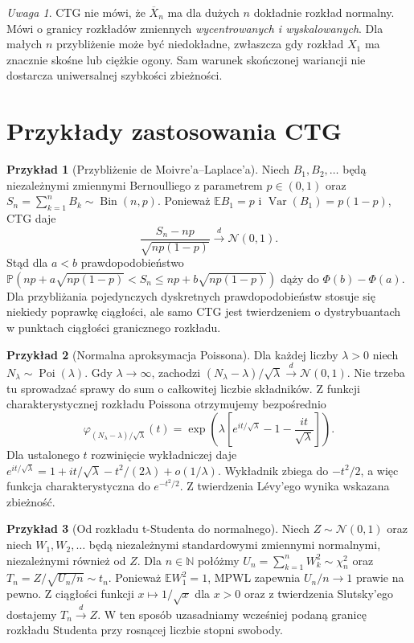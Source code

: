 \documentclass[11pt,a4paper,oneside]{report}
\numberwithin{equation}{chapter}
\theoremstyle{plain}
\theoremstyle{definition}
\newtheorem{przyklad}{Przykład}[chapter]
\theoremstyle{remark}
\newtheorem{uwaga}{Uwaga}[chapter]
\newcommand{\N}{\mathbb{N}}
\newcommand{\Prob}{\mathbb{P}}
\newcommand{\E}{\mathbb{E}}
\newcommand{\Var}{\operatorname{Var}}
\newcommand{\Bin}{\operatorname{Bin}}
\newcommand{\Poi}{\operatorname{Poi}}
\newcommand{\Normal}{\mathcal{N}}
\begin{document}
\begin{uwaga}
CTG nie mówi, że $\overline X_n$ ma dla dużych $n$
dokładnie rozkład normalny. Mówi o granicy rozkładów
zmiennych \emph{wycentrowanych i wyskalowanych}.
Dla małych $n$ przybliżenie może być niedokładne,
zwłaszcza gdy rozkład $X_1$ ma znacznie skośne
lub ciężkie ogony. Sam warunek skończonej wariancji
nie dostarcza uniwersalnej szybkości zbieżności.
\end{uwaga}

\section{Przykłady zastosowania CTG}

\begin{przyklad}[Przybliżenie de Moivre'a--Laplace'a]
Niech $B_1,B_2,\ldots$ będą niezależnymi zmiennymi
Bernoulliego z parametrem $p\in(0,1)$ oraz
$S_n=\sum_{k=1}^nB_k\sim\Bin(n,p)$.
Ponieważ $\E B_1=p$ i $\Var(B_1)=p(1-p)$,
CTG daje
\[
\frac{S_n-np}{\sqrt{np(1-p)}}\xrightarrow d\Normal(0,1).
\]
Stąd dla $a<b$ prawdopodobieństwo
$\Prob(np+a\sqrt{np(1-p)}<S_n\leq
np+b\sqrt{np(1-p)})$ dąży do $\Phi(b)-\Phi(a)$.
Dla przybliżania pojedynczych dyskretnych
prawdopodobieństw stosuje się niekiedy poprawkę ciągłości,
ale samo CTG jest twierdzeniem o dystrybuantach
w punktach ciągłości granicznego rozkładu.
\end{przyklad}

\begin{przyklad}[Normalna aproksymacja Poissona]
Dla każdej liczby $\lambda>0$ niech
$N_\lambda\sim\Poi(\lambda)$. Gdy $\lambda\to\infty$,
zachodzi
$(N_\lambda-\lambda)/\sqrt\lambda\xrightarrow d\Normal(0,1)$.
Nie trzeba tu sprowadzać sprawy do sum o całkowitej
liczbie składników. Z funkcji charakterystycznej
rozkładu Poissona otrzymujemy bezpośrednio
\[
\varphi_{(N_\lambda-\lambda)/\sqrt\lambda}(t)
=\exp\!\left(\lambda\left[e^{it/\sqrt\lambda}
-1-\frac{it}{\sqrt\lambda}\right]\right).
\]
Dla ustalonego $t$ rozwinięcie wykładniczej daje
$e^{it/\sqrt\lambda}=1+it/\sqrt\lambda
-t^2/(2\lambda)+o(1/\lambda)$.
Wykładnik zbiega do $-t^2/2$, a więc
funkcja charakterystyczna do $e^{-t^2/2}$.
Z twierdzenia Lévy'ego wynika wskazana zbieżność.
\end{przyklad}

\begin{przyklad}[Od rozkładu t-Studenta do normalnego]
Niech $Z\sim\Normal(0,1)$ oraz niech
$W_1,W_2,\ldots$ będą niezależnymi standardowymi
zmiennymi normalnymi, niezależnymi również od $Z$.
Dla $n\in\N$ połóżmy
$U_n=\sum_{k=1}^nW_k^2\sim\chi_n^2$ oraz
$T_n=Z/\sqrt{U_n/n}\sim t_n$.
Ponieważ $\E W_1^2=1$, MPWL zapewnia
$U_n/n\to1$ prawie na pewno. Z ciągłości funkcji
$x\mapsto1/\sqrt x$ dla $x>0$ oraz z twierdzenia
Slutsky'ego dostajemy $T_n\xrightarrow d Z$.
W ten sposób uzasadniamy wcześniej podaną granicę
rozkładu Studenta przy rosnącej liczbie stopni swobody.
\end{przyklad}
\end{document}
